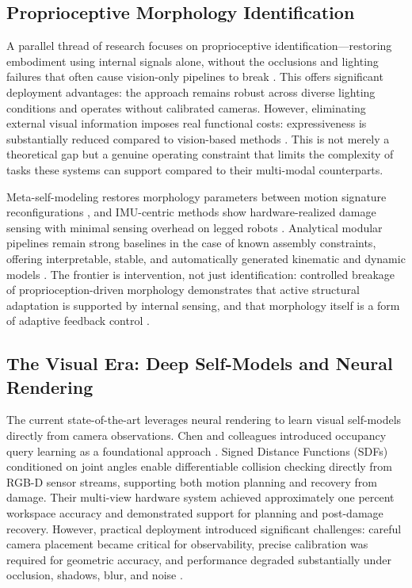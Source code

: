 \documentclass[12pt,a4paper,oneside]{report}
\begin{document}
\subsection{Proprioceptive Morphology Identification}

A parallel thread of research focuses on proprioceptive identification---restoring embodiment using internal signals alone, without the occlusions and lighting failures that often cause vision-only pipelines to break \cite{hu2024reconfigurable}. This offers significant deployment advantages: the approach remains robust across diverse lighting conditions and operates without calibrated cameras. However, eliminating external visual information imposes real functional costs: expressiveness is substantially reduced compared to vision-based methods \cite{farghdani2025robust}. This is not merely a theoretical gap but a genuine operating constraint that limits the complexity of tasks these systems can support compared to their multi-modal counterparts.

Meta-self-modeling restores morphology parameters between motion signature reconfigurations \cite{hu2024reconfigurable}, and IMU-centric methods show hardware-realized damage sensing with minimal sensing overhead on legged robots \cite{farghdani2025robust}. Analytical modular pipelines remain strong baselines in the case of known assembly constraints, offering interpretable, stable, and automatically generated kinematic and dynamic models \cite{dogra2022unified}. The frontier is intervention, not just identification: controlled breakage of proprioception-driven morphology demonstrates that active structural adaptation is supported by internal sensing, and that morphology itself is a form of adaptive feedback control \cite{xu2026antenna, yu2026kinematicself}.

\subsection{The Visual Era: Deep Self-Models and Neural Rendering}

The current state-of-the-art leverages neural rendering to learn visual self-models directly from camera observations. Chen and colleagues introduced occupancy query learning as a foundational approach \cite{chen2022full}. Signed Distance Functions (SDFs) conditioned on joint angles enable differentiable collision checking directly from RGB-D sensor streams, supporting both motion planning and recovery from damage. Their multi-view hardware system achieved approximately one percent workspace accuracy and demonstrated support for planning and post-damage recovery. However, practical deployment introduced significant challenges: careful camera placement became critical for observability, precise calibration was required for geometric accuracy, and performance degraded substantially under occlusion, shadows, blur, and noise \cite{chen2022full}.
\end{document}
